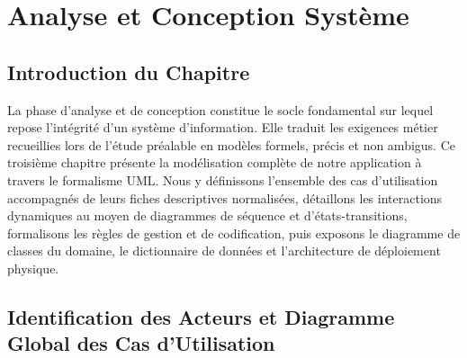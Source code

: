 \documentclass{bts-report}
\begin{document}
\chapter{Analyse et Conception Syst\`eme}

\section*{Introduction du Chapitre}
La phase d'analyse et de conception constitue le socle fondamental sur lequel repose l'int\'egrit\'e d'un syst\`eme d'information. Elle traduit les exigences m\'etier recueillies lors de l'\'etude pr\'ealable en mod\`eles formels, pr\'ecis et non ambigus. Ce troisi\`eme chapitre pr\'esente la mod\'elisation compl\`ete de notre application \`a travers le formalisme UML. Nous y d\'efinissons l'ensemble des cas d'utilisation accompagn\'es de leurs fiches descriptives normalis\'ees, d\'etaillons les interactions dynamiques au moyen de diagrammes de s\'equence et d'\'etats-transitions, formalisons les r\`egles de gestion et de codification, puis exposons le diagramme de classes du domaine, le dictionnaire de donn\'ees et l'architecture de d\'eploiement physique.

\section{Identification des Acteurs et Diagramme Global des Cas d'Utilisation}
\end{document}

